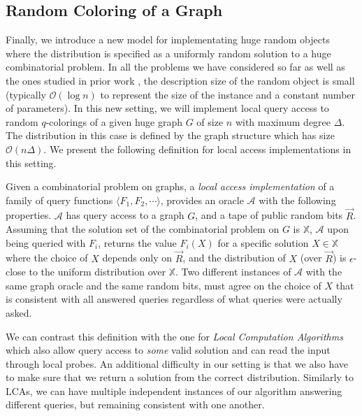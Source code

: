 \subsection{Random Coloring of a Graph}
\label{sec:overview_random_coloring_of_a_graph}
Finally, we introduce a new model for implementating huge random objects
where the distribution is specified as a uniformly random solution to a huge combinatorial problem.
In all the problems we have considered so far as well as the ones studied in prior work \cite{huge,sparse,reut}, the description size
of the random object is small (typically $\mathcal O(\log n)$ to represent the size of the instance and a constant number of parameters).
In this new setting, we will implement local query access to random $q$-colorings of a given huge graph $G$ of size $n$ with maximum degree $\Delta$.
The distribution in this case is defined by the graph structure which has size $\mathcal O(n\Delta)$.
We present the following definition for local access implementations in this setting.

\begin{definition}
\label{def:local_access_LCA}
Given a combinatorial problem on graphs,
a \emph{local access implementation} of a family of query functions $\langle F_1, F_2,\cdots \rangle$,
provides an oracle $\mathcal A$ with the following properties.
$\mathcal A$ has query access to a graph $G$, and a tape of public random bits $\vec R$.
Assuming that the solution set of the combinatorial problem on $G$ is $\mathbb X$,
$\mathcal A$ upon being queried with $F_i$, returns the value $F_i(X)$ for a specific solution $X\in\mathbb X$ where the choice of $X$
depends only on $\vec R$, and the distribution of $X$ (over $\vec R$) is $\epsilon$-close to the uniform distribution over $\mathbb X$.
Two different instances of $\mathcal A$ with the same graph oracle and the same random bits,
must agree on the choice of $X$ that is consistent with all answered queries regardless of what queries were actually asked.
\end{definition}

We can contrast this definition with the one for \emph{Local Computation Algorithms} \cite{LCA, LCA_space_efficient}
which also allow query access to \emph{some} valid solution and can read the input through local probes.
An additional difficulty in our setting is that we also have to make sure that we return a solution from the correct distribution.
Similarly to LCAs, we can have multiple independent instances of our algorithm answering different queries, but remaining consistent with one another.


